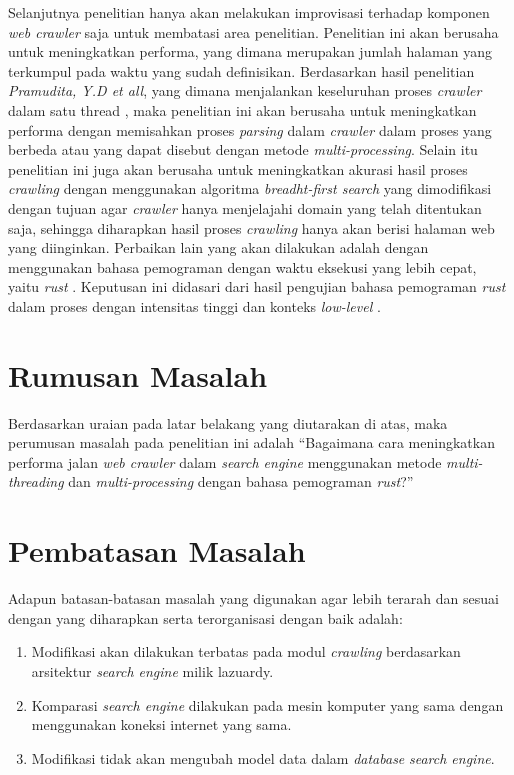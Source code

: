 Selanjutnya penelitian hanya akan melakukan improvisasi terhadap komponen \emph{web crawler} saja untuk membatasi area penelitian. Penelitian ini akan berusaha untuk meningkatkan performa, yang dimana merupakan jumlah halaman yang terkumpul pada waktu yang sudah definisikan. Berdasarkan hasil penelitian \emph{Pramudita, Y.D et all}, yang dimana menjalankan keseluruhan proses \emph{crawler} dalam satu thread \citep{Pramudita_2020}, maka penelitian ini akan berusaha untuk meningkatkan performa dengan memisahkan proses \emph{parsing} dalam \emph{crawler} dalam proses yang berbeda atau yang dapat disebut dengan metode \emph{multi-processing}. Selain itu penelitian ini juga akan berusaha untuk meningkatkan akurasi hasil proses \emph{crawling} dengan menggunakan algoritma \emph{breadht-first search} yang dimodifikasi dengan tujuan agar \emph{crawler} hanya menjelajahi domain yang telah ditentukan saja, sehingga diharapkan hasil proses \emph{crawling} hanya akan berisi halaman web yang diinginkan. Perbaikan lain yang akan dilakukan adalah dengan menggunakan bahasa pemograman dengan waktu eksekusi yang lebih cepat, yaitu \emph{rust} \citep{RustPerformance}. Keputusan ini didasari dari hasil pengujian bahasa pemograman \emph{rust} dalam proses dengan intensitas tinggi dan konteks \emph{low-level} \citep{RustPerformance}.


\section{Rumusan Masalah}
Berdasarkan uraian pada latar belakang yang diutarakan di atas, maka perumusan masalah pada penelitian ini adalah “Bagaimana cara meningkatkan performa jalan \emph{web crawler} dalam \emph{search engine} menggunakan metode \emph{multi-threading} dan \emph{multi-processing} dengan bahasa pemograman \emph{rust}?”

\section{Pembatasan Masalah}
Adapun batasan-batasan masalah yang digunakan agar lebih terarah dan sesuai dengan yang diharapkan serta terorganisasi dengan baik adalah:
\begin{enumerate}
  \item Modifikasi akan dilakukan terbatas pada modul \emph{crawling} berdasarkan arsitektur \emph{search engine} milik lazuardy.
  \item Komparasi \emph{search engine} dilakukan pada mesin komputer yang sama dengan menggunakan koneksi internet yang sama.
  \item Modifikasi tidak akan mengubah model data dalam \emph{database} \emph{search engine}.
\end{enumerate}

